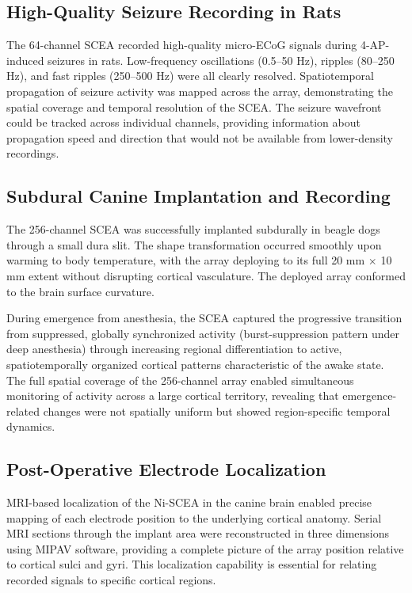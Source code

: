\documentclass[11pt]{article}
\begin{document}
\subsection{High-Quality Seizure Recording in Rats}

The 64-channel SCEA recorded high-quality micro-ECoG signals during 4-AP-induced seizures in rats. Low-frequency oscillations (0.5--50 Hz), ripples (80--250 Hz), and fast ripples (250--500 Hz) were all clearly resolved. Spatiotemporal propagation of seizure activity was mapped across the array, demonstrating the spatial coverage and temporal resolution of the SCEA. The seizure wavefront could be tracked across individual channels, providing information about propagation speed and direction that would not be available from lower-density recordings.

\subsection{Subdural Canine Implantation and Recording}

The 256-channel SCEA was successfully implanted subdurally in beagle dogs through a small dura slit. The shape transformation occurred smoothly upon warming to body temperature, with the array deploying to its full 20 mm $\times$ 10 mm extent without disrupting cortical vasculature. The deployed array conformed to the brain surface curvature.

During emergence from anesthesia, the SCEA captured the progressive transition from suppressed, globally synchronized activity (burst-suppression pattern under deep anesthesia) through increasing regional differentiation to active, spatiotemporally organized cortical patterns characteristic of the awake state. The full spatial coverage of the 256-channel array enabled simultaneous monitoring of activity across a large cortical territory, revealing that emergence-related changes were not spatially uniform but showed region-specific temporal dynamics.

\subsection{Post-Operative Electrode Localization}

MRI-based localization of the Ni-SCEA in the canine brain enabled precise mapping of each electrode position to the underlying cortical anatomy. Serial MRI sections through the implant area were reconstructed in three dimensions using MIPAV software, providing a complete picture of the array position relative to cortical sulci and gyri. This localization capability is essential for relating recorded signals to specific cortical regions.
\end{document}
